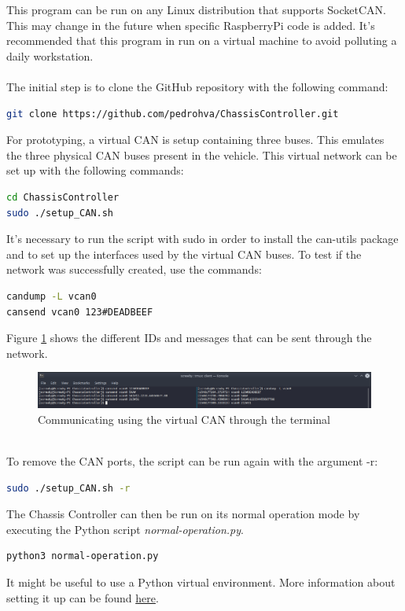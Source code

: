 
This program can be run on any Linux distribution that supports SocketCAN. This may change in the future when specific RaspberryPi code is added. It's recommended that this program in run on a virtual machine to avoid polluting a daily workstation. 
\\
\\
The initial step is to clone the GitHub repository with the following command:
\begin{lstlisting}[language=bash]
git clone https://github.com/pedrohva/ChassisController.git
\end{lstlisting}
For prototyping, a virtual CAN is setup containing three buses. This emulates the three physical CAN buses present in the vehicle. This virtual network can be set up with the following commands:
\begin{lstlisting}[language=bash]
cd ChassisController
sudo ./setup_CAN.sh
\end{lstlisting}
It's necessary to run the script with sudo in order to install the can-utils package and to set up the interfaces used by the virtual CAN buses.
\newline
To test if the  network was successfully created, use the commands:
\begin{lstlisting}[language=bash]
candump -L vcan0
cansend vcan0 123#DEADBEEF
\end{lstlisting}
Figure \ref{fig:can-test} shows the different IDs and messages that can be sent through the network. 
\begin{figure} [!ht]
	\centering
	\includegraphics[width=1\textwidth]{manual-src/images/can_test} 
	\caption{Communicating using the virtual CAN through the terminal}
	\label{fig:can-test} 
\end{figure}
\\
To remove the CAN ports, the script can be run again with the argument -r:
\begin{lstlisting}[language=bash]
sudo ./setup_CAN.sh -r
\end{lstlisting}
The Chassis Controller can then be run on its normal operation mode by executing the Python script \emph{normal-operation.py}.
\begin{lstlisting}[language=bash]
python3 normal-operation.py
\end{lstlisting}
It might be useful to use a Python virtual environment. More information about setting it up can be found \href{https://docs.python.org/3.7/tutorial/venv.html}{here}.